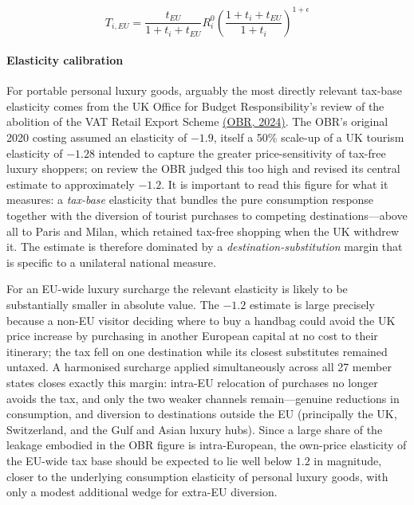 \documentclass{article}
\begin{document}
\[
T_{i,EU}=\frac{t_{EU}}{1+t_i+t_{EU}} R_i^0 \left(\frac{1+t_i+t_{EU}}{1+t_i}\right)^{1+\epsilon}
\]

\paragraph{Elasticity calibration} %

For portable personal luxury goods, arguably the most directly relevant tax-base elasticity comes from the UK Office for
Budget Responsibility's review of the abolition of the VAT Retail Export Scheme
\href{https://obr.uk/box/vat-retail-export-scheme-review-of-the-2020-policy-costing/}{(OBR,
2024)}. The OBR's original 2020 costing assumed an elasticity of $-1.9$, itself
a 50\% scale-up of a UK tourism elasticity of $-1.28$ intended to capture the
greater price-sensitivity of tax-free luxury shoppers; on review the OBR judged
this too high and revised its central estimate to approximately $-1.2$. It is
important to read this figure for what it measures: a \emph{tax-base} elasticity
that bundles the pure consumption response together with the diversion of
tourist purchases to competing destinations---above all to Paris and Milan,
which retained tax-free shopping when the UK withdrew it. The estimate is
therefore dominated by a \emph{destination-substitution} margin that is specific
to a unilateral national measure.

For an EU-wide luxury surcharge the relevant elasticity is likely to be
substantially smaller in absolute value. The $-1.2$ estimate is large precisely
because a non-EU visitor deciding where to buy a handbag could avoid the UK
price increase by purchasing in another European capital at no cost to their
itinerary; the tax fell on one destination while its closest substitutes
remained untaxed. A harmonised surcharge applied simultaneously across all 27
member states closes exactly this margin: intra-EU relocation of purchases no
longer avoids the tax, and only the two weaker channels remain---genuine
reductions in consumption, and diversion to destinations outside the EU
(principally the UK, Switzerland, and the Gulf and Asian luxury hubs). Since a
large share of the leakage embodied in the OBR figure is intra-European, the
own-price elasticity of the EU-wide tax base should be expected to lie well
below $1.2$ in magnitude, closer to the underlying consumption elasticity of
personal luxury goods, with only a modest additional wedge for extra-EU
diversion.
\end{document}
